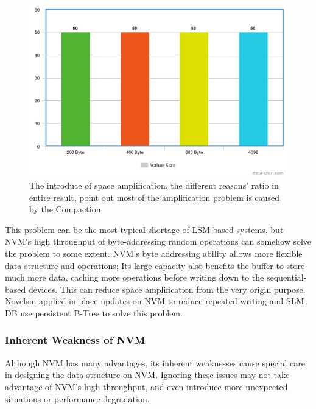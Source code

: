 \begin{figure}
	\centering
	\includegraphics[width=0.7\columnwidth]{fig/meta2}
	\caption{The introduce of space amplification, the different reasons' ratio in entire result, point out most of the amplification problem is caused by the Compaction}
	\label{fig:space_amplification}
\end{figure}

This problem can be the most typical shortage of LSM-based systems, but NVM's high throughput of byte-addressing random operations can somehow solve the problem to some extent. NVM's byte addressing ability allows more flexible data structure and operations; Its large capacity also benefits the buffer to store much more data, caching more operations before writing down to the sequential-based devices. This can reduce space amplification from the very origin purpose. Novelsm\cite{kannan2018redesigning} applied in-place updates on NVM to reduce repeated writing and SLM-DB use persistent B-Tree to solve this problem.


%

\subsubsection{Inherent Weakness of NVM}
Although NVM has many advantages, its inherent weaknesses cause special care in designing the data structure on NVM. Ignoring these issues may not take advantage of NVM's high throughput, and even introduce more unexpected situations or performance degradation.

